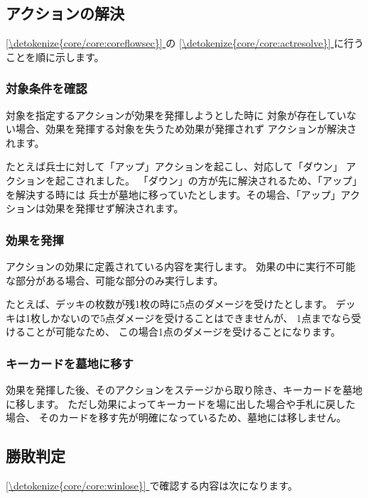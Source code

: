 \documentclass[letterpaper,10pt,dvipdfmx]{sphinxmanual}
\begin{document}
\subsection{アクションの解決}
\label{\detokenize{common/common:id24}}
\sphinxAtStartPar
\hyperref[\detokenize{core/core:coreflowsec}]{\ref{\detokenize{core/core:coreflowsec}} } の
\hyperref[\detokenize{core/core:actresolve}]{\ref{\detokenize{core/core:actresolve}} } に行うことを順に示します。


\subsubsection{対象条件を確認}
\label{\detokenize{common/common:id25}}
\sphinxAtStartPar
対象を指定するアクションが効果を発揮しようとした時に
対象が存在していない場合、効果を発揮する対象を失うため効果が発揮されず
アクションが解決されます。

\sphinxAtStartPar
たとえば兵士に対して「アップ」アクションを起こし、対応して「ダウン」
アクションを起こされました。
「ダウン」の方が先に解決されるため、「アップ」を解決する時には
兵士が墓地に移っていたとします。その場合、「アップ」アクションは効果を発揮せず解決されます。


\subsubsection{効果を発揮}
\label{\detokenize{common/common:id26}}
\sphinxAtStartPar
アクションの効果に定義されている内容を実行します。
効果の中に実行不可能な部分がある場合、可能な部分のみ実行します。

\sphinxAtStartPar
たとえば、デッキの枚数が残1枚の時に5点のダメージを受けたとします。
デッキは1枚しかないので5点ダメージを受けることはできませんが、
1点までなら受けることが可能なため、
この場合1点のダメージを受けることになります。


\subsubsection{キーカードを墓地に移す}
\label{\detokenize{common/common:keycard-gy}}\label{\detokenize{common/common:id27}}
\sphinxAtStartPar
効果を発揮した後、そのアクションをステージから取り除き、キーカードを墓地に移します。
ただし効果によってキーカードを場に出した場合や手札に戻した場合、
そのカードを移す先が明確になっているため、墓地には移しません。


\subsection{勝敗判定}
\label{\detokenize{common/common:id28}}
\sphinxAtStartPar
\hyperref[\detokenize{core/core:winlose}]{\ref{\detokenize{core/core:winlose}} } で確認する内容は次になります。
\end{document}
